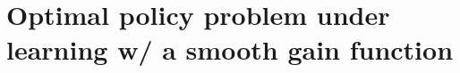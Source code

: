 \documentclass[11pt]{article}
\renewcommand{\[}{\begin{equation}}
\renewcommand{\]}{\end{equation}}
\DeclareMathOperator{\E}{\mathbb{E}}
\begin{document}
\section{Optimal policy problem under learning w/ a smooth gain function}
%
\end{document}
